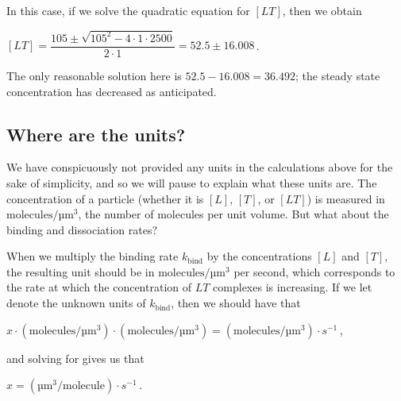 \noindent In this case, if we solve the quadratic equation for $[LT]$, then we obtain

\begin{center}
$[LT] = \dfrac{105 \pm \sqrt{105^2 - 4 \cdot 1 \cdot 2500}}{2 \cdot 1} = 52.5 \pm 16.008$\,.
\end{center}

\noindent The only reasonable solution here is $52.5-16.008 = 36.492$; the steady state concentration has decreased as anticipated.\\

\begin{qbox}\end{qbox}

\FloatBarrier
{}
\subsection{Where are the units?}

We have conspicuously not provided any units in the calculations above for the sake of simplicity, and so we will pause to explain what these units are. The concentration of a particle (whether it is $[L]$, $[T]$, or $[LT]$) is measured in $\text{molecules}/\text{µm}^3$, the number of molecules per unit volume. But what about the binding and dissociation rates?

When we multiply the binding rate $k_\text{bind}$ by the concentrations $[L]$ and $[T]$, the resulting unit should be in $\text{molecules}/\text{µm}^3$ per second, which corresponds to the rate at which the concentration of $LT$ complexes is increasing. If we let  denote the unknown units of $k_\text{bind}$, then we should have that

\begin{center}
$x \cdot (\text{molecules}/\text{µm}^3) \cdot (\text{molecules}/\text{µm}^3) = (\text{molecules}/\text{µm}^3) \cdot s^{-1}$\,,
\end{center}

\noindent and solving for  gives us that

\begin{center}
$x = (\text{µm}^3/\text{molecule}) \cdot s^{-1}$\,.
\end{center}

